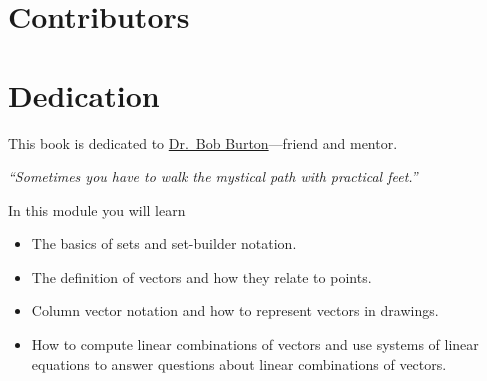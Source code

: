 \makeindex[title=Index of Terms, columns=3]
\makeindex[name=definitions, title=Index of Definitions, columns=3]
\makeindex[name=symbols, title=Index of Symbols, columns=3]












\pagestyle{empty}



\newpage

\begin{bookonly}
	\clearpage
	\hbox{}
	\newpage
	
	\section*{Contributors}
	
	\section*{Dedication}
	\begin{center}
		This book is dedicated to
		\href{https://www.gazettetimes.com/news/local/obituaries/dr-robert-main-burton/article_9c087f07-c005-515a-bb3f-2c9c6a6b7332.html}{\color{blue}Dr.~Bob Burton}---friend and mentor.

		\emph{\large ``Sometimes you have to walk the mystical path with practical feet.''}
	\end{center}
	\newpage
	\mbox{}
	\newpage
\end{bookonly}

\setcounter{page}{1}
\pagestyle{siefken}



\begin{module}

	In this module you will learn
	\begin{itemize}
		\item The basics of sets and set-builder notation.
		\item The definition of vectors and how they relate to points.
		\item Column vector notation and how to represent vectors in drawings.
		\item How to compute linear combinations of vectors and use systems of linear
			equations to answer questions about linear combinations of vectors.
	\end{itemize}

	
	
\end{module}

